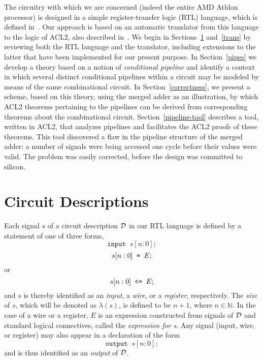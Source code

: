 \documentclass{article}
\begin{document}
The circuitry with which we are concerned (indeed the entire AMD
Athlon processor) is designed in a simple register-transfer logic
(RTL) language, which is defined in~\cite{mult}.  Our approach is
based on an automatic translator from this language to the logic of
ACL2, also described in~\cite{mult}.  We begin in
Sections~\ref{circuit-descriptions} and~\ref{trans} by reviewing both
the RTL language and the translator, including extensions to the
latter that have been implemented for our present purpose.  In
Section~\ref{pipes} we develop a theory based on a notion of {\it
conditional pipeline} and identify a context in which several distinct
conditional pipelines within a circuit may be modeled by means of the
same combinational circuit.  In Section~\ref{correctness}, we present
a scheme, based on this theory, using the merged adder as an
illustration, by which ACL2 theorems pertaining to the pipelines can
be derived from corresponding theorems about the combinational
circuit.  Section~\ref{pipeline-tool} describes a tool, written in
ACL2, that analyzes pipelines and facilitates the ACL2 proofs of these
theorems.  This tool discovered a flaw in the pipeline structure of
the merged adder: a number of signals were being accessed one cycle
before their values were valid.  The problem was easily corrected,
before the design was committed to silicon.

\section{Circuit Descriptions}\label{circuit-descriptions}

Each signal $s$ of a circuit description ${\cal D}$ in our RTL
language is defined by a statement of one of three forms,
\begin{equation}\label{input}
\texttt{input}\;\;s[n:0];
\end{equation}
\begin{equation}\label{wire}
s[n:0]\mbox{\texttt{~= }}E;
\end{equation}
or
\begin{equation}\label{reg}
s[n:0]\mbox{\texttt{~<=~}}E;
\end{equation}
and $s$ is thereby identified as an {\it input}, a {\it wire}, or a
{\it register}, respectively.  The {\it size} of $s$, which will be
denoted as $\lambda(s)$, is defined to be $n+1$, where $n \in {\mathbb
N}$.  In the case of a wire or a register, $E$ is an expression
constructed from signals of ${\cal D}$ and standard logical
connectives, called the {\it expression for s}.  Any signal (input,
wire, or register) may also appear in a declaration of the form
\begin{equation}
\texttt{output}\;\;s[n:0];
\end{equation}
and is thus identified as an {\it output} of ${\cal D}$.
\end{document}
